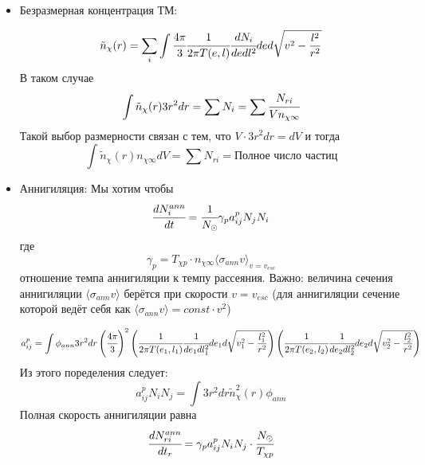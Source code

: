 \documentclass[a4paper, 14pt]{article}
\begin{document}
\begin{itemize}
		При интегрировании методом Монте-Карло берется случайное время $\tau$ траектории, скорость мишени (относительно распределения больцмана $ \left[ d^3v_p f_p(v) \right]$ ). Энергия и импульс частицы ТМ генерируются внутри бина в предположении, что они равномерно распределены относительно меры либо $dEdL$ либо $dEdL^2$. Конечная скорость определяется направлением вектора разности скоростей в системе центра масс $d\vec{n}'_{CM}$.
		
		\item Безразмерная концентрация ТМ:
		
		\begin{equation*}
			\tilde{n}_{\chi}(r) = \sum_i{\int{\cfrac{4\pi}{3} \cfrac{1}{2\pi T(e,l)} \cfrac{dN_i}{dedl^2} de d\sqrt{v^2-\frac{l^2}{r^2}} }}
		\end{equation*}
		 В таком случае
		 \begin{equation*}
		 	\int{\tilde{n}_{\chi}(r) 3r^2dr} = \sum{N_i} = \sum{\cfrac{N_{ri}}{V n_{\chi \infty}}}
		 \end{equation*}
		 Такой выбор размерности связан с тем, что $V \cdot 3r^2dr = dV$ и тогда
		 \begin{equation*}
		 	\int{\tilde{n}_{\chi}(r) n_{\chi \infty} dV} = \sum{N_{ri}} = \text{Полное число частиц}
		 \end{equation*}
		\item Аннигиляция:
		Мы хотим чтобы
		\begin{equation}
			\cfrac{d N_{i}^{ann}}{dt} = \cfrac{1}{N_{\odot}}\gamma_p a^{p}_{ij} N_j N_i
		\end{equation}
		где 
		\begin{equation*}
			\gamma_p = T_{\chi p} \cdot n_{\chi \infty} \langle\sigma_{ann} v\rangle_{v = v_{esc}}
		\end{equation*}
		отношение темпа аннигиляции к темпу рассеяния. Важно: величина сечения аннигиляции $\langle\sigma_{ann} v\rangle$ берётся при скорости $v = v_{esc}$ (для аннигиляции сечение которой ведёт себя как $\langle\sigma_{ann} v\rangle = const\cdot v^2$)
		
		\begin{equation*}
			a_{ij}^p = \int{\phi_{ann} 3r^2dr\left(\cfrac{4\pi}{3}\right)^2 \left( \cfrac{1}{2\pi T(e_1,l_1)} \cfrac{1}{de_1dl_1^2} de_1 d\sqrt{v_1^2-\frac{l_1^2}{r^2}} \right) \left( \cfrac{1}{2\pi T(e_2,l_2)} \cfrac{1}{de_2dl_2^2} de_2 d\sqrt{v_2^2-\frac{l_2^2}{r^2}} \right)}
		\end{equation*}
		Из этого поределения следует:
		\begin{equation*}
			a_{ij}^p N_i N_j = \int{3r^2dr \tilde{n}^2_{\chi}(r) \phi_{ann}}
		\end{equation*}
		Полная скорость аннигиляции равна
		\begin{equation*}
			\cfrac{dN^{ann}_{ri}}{dt_r} = \gamma_p a_{ij}^p N_i N_j \cdot \cfrac{N_{\odot}}{T_{\chi p}}
		\end{equation*}
		
	\end{itemize}
 
\end{document}
